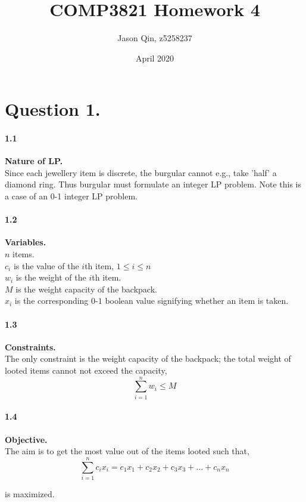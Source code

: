 \documentclass{article}
\title{COMP3821 Homework 4}
\author{Jason Qin, z5258237}
\date{April 2020}
\begin{document}
\maketitle

\section*{Question 1.}
\paragraph{1.1} \textbf{Nature of LP.} \\

\noindent
Since each jewellery item is discrete, the burgular cannot e.g., take 'half' a diamond ring.
Thus burgular must formulate an integer LP problem. Note this is a case of an 0-1 integer LP problem.

\paragraph{1.2} \textbf{Variables.} \\

\noindent
$n$ items.\\
$c_i$ is the value of the $i$th item, $1 \leq i \leq n$ \\
$w_i$ is the weight of the $i$th item. \\
$M$ is the weight capacity of the backpack. \\
$x_i$ is the corresponding $0$-$1$ boolean value signifying whether an item is taken. \\

\paragraph{1.3} \textbf{Constraints.} \\

\noindent
The only constraint is the weight capacity of the backpack; the total weight of
looted items cannot not exceed the capacity,
$$\sum_{i=1}^{n} w_i \leq M$$

\paragraph*{1.4} \textbf{Objective.} \\

\noindent
The aim is to get the most value out of the items looted such that,
$$\sum_{i=1}^{n} c_ix_i = c_1x_1 + c_2x_2 + c_3x_3 + ... + c_nx_n$$

is maximized.
\end{document}
